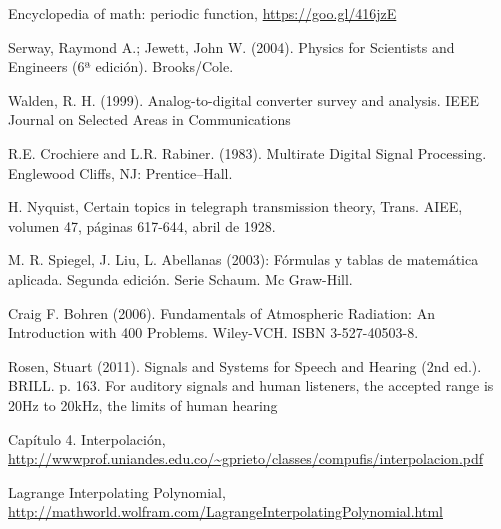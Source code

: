 \documentclass[comsoc, journal]{IEEEtran}
\begin{document}
\begin{thebibliography}{1}

Encyclopedia of math: periodic function,
\url{https://goo.gl/416jzE}

Serway, Raymond A.; Jewett, John W. (2004). Physics for Scientists and Engineers (6ª edición). Brooks/Cole.

Walden, R. H. (1999). Analog-to-digital converter survey and analysis. IEEE Journal on Selected Areas in Communications

R.E. Crochiere and L.R. Rabiner. (1983). Multirate Digital Signal Processing. Englewood Cliffs, NJ: Prentice–Hall.

H. Nyquist, Certain topics in telegraph transmission theory, Trans. AIEE, volumen 47, páginas 617-644, abril de 1928.

M. R. Spiegel, J. Liu, L. Abellanas (2003): Fórmulas y tablas de matemática aplicada. Segunda edición. Serie Schaum. Mc Graw-Hill.

Craig F. Bohren (2006). Fundamentals of Atmospheric Radiation: An Introduction with 400 Problems. Wiley-VCH. ISBN 3-527-40503-8.

Rosen, Stuart (2011). Signals and Systems for Speech and Hearing (2nd ed.). BRILL. p. 163. For auditory signals and human listeners, the accepted range is 20Hz to 20kHz, the limits of human hearing

Capítulo 4. Interpolación,
\url{http://wwwprof.uniandes.edu.co/~gprieto/classes/compufis/interpolacion.pdf}

Lagrange Interpolating Polynomial,
\url{http://mathworld.wolfram.com/LagrangeInterpolatingPolynomial.html}

\end{thebibliography}
\end{document}
